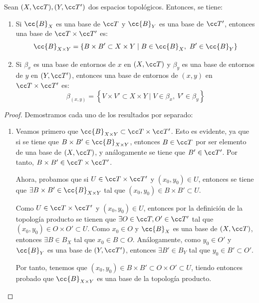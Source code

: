 \begin{prop}
    Sean $(X,\T), (Y,\T')$ dos espacios topológicos. Entonces, se tiene:
    \begin{enumerate}
        \item Si $\cc{B}_X$ es una base de $\T$ y $\cc{B}_Y$ es una base de $\T'$, entonces una base de $\T\times \T'$ es:
        \begin{equation*}
            \cc{B}_{X\times Y}=\left\{B\times B'\subset X\times Y\mid B\in \cc{B}_X,~B'\in \cc{B}_Y\right\}
        \end{equation*}

        \item Si $\beta_x$ es una base de entornos de $x$ en $(X,\T)$ y $\beta_y$ es una base de entornos de $y$ en $(Y,\T')$, entonces una base de entornos de $(x,y)$ en $\T\times \T'$ es:
        \begin{equation*}
            \beta_{(x,y)}=\left\{V\times V'\subset X\times Y\mid V\in \beta_x,~V'\in \beta_y\right\}
        \end{equation*}
    \end{enumerate}
\end{prop}
\begin{proof}
    Demostramos cada uno de los resultados por separado:
    \begin{enumerate}
        \item Veamos primero que $\cc{B}_{X\times Y}\subset \T\times \T'$. Esto es evidente, ya que si se tiene que $B\times B'\in\cc{B}_{X\times Y}$, entonces $B\in \T$ por ser elemento de una base de $(X,\T)$, y análogamente se tiene que $B'\in \T'$. Por tanto, $B\times B'\in \T\times \T'$.

        Ahora, probamos que si $U\in \T\times \T'$ y $(x_0,y_0)\in U$, entonces se tiene que $\exists B\times B'\in \cc{B}_{X\times Y}$ tal que $(x_0,y_0)\in B\times B'\subset U$.

        Como $U\in \T\times \T'$ y $(x_0,y_0)\in U$, entonces por la definición de la topología producto se tienen que $\exists O\in \T,O'\in \T'$ tal que $(x_0,y_0)\in O\times O'\subset U$. Como $x_0\in O$ y $\cc{B}_X$ es una base de $(X,\T)$, entonces $\exists B\in B_X$ tal que $x_0\in B\subset O$. Análogamente, como $y_0\in O'$ y $\cc{B}_Y$ es una base de $(Y,\T')$, entonces $\exists B'\in B_Y$ tal que $y_0\in B'\subset O'$.
        
        Por tanto, tenemos que $(x_0,y_0)\in B\times B'\subset O\times O'\subset U$, tiendo entonces probado que $\cc{B}_{X\times Y}$ es una base de la topología producto.

    \end{enumerate}
\end{proof}
